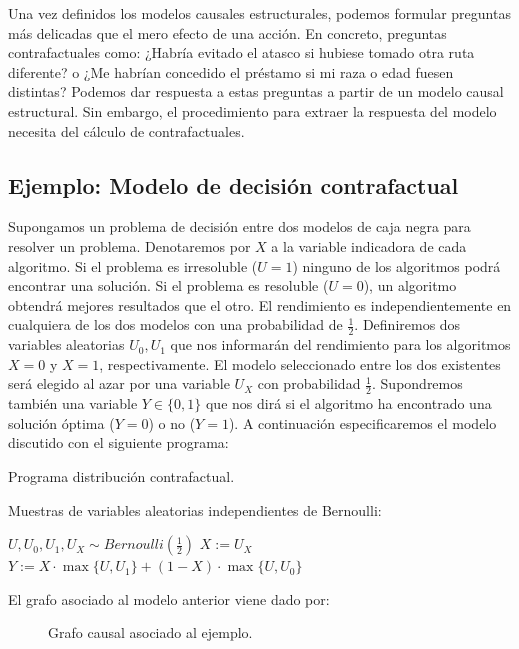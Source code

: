 \documentclass[oneside,openright,titlepage,numbers=noenddot,openany,headinclude,footinclude=true,
cleardoublepage=empty,abstractoff,BCOR=5mm,paper=a4,fontsize=12pt,main=spanish]{scrreprt}
\begin{document}
Una vez definidos los modelos causales estructurales, podemos formular preguntas más delicadas que el mero efecto de una acción. En concreto, preguntas contrafactuales como: ¿Habría evitado el atasco si hubiese tomado otra ruta diferente? o ¿Me habrían concedido el préstamo si mi raza o edad fuesen distintas? Podemos dar respuesta a estas preguntas a partir de un modelo causal estructural. Sin embargo, el procedimiento para extraer la respuesta del modelo necesita del cálculo de contrafactuales.

\subsection{Ejemplo: Modelo de decisión contrafactual}

Supongamos un problema de decisión entre dos modelos de caja negra para resolver un problema. Denotaremos por $X$ a la variable indicadora de cada algoritmo. Si el problema es irresoluble ($U=1$) ninguno de los algoritmos podrá encontrar una solución. Si el problema es resoluble ($U=0$), un algoritmo obtendrá mejores resultados que el otro. El rendimiento es independientemente en cualquiera de los dos modelos con una probabilidad de $\frac{1}{2}$. Definiremos dos variables aleatorias $U_0, U_1$ que nos informarán del rendimiento para los algoritmos $X=0$ y $X=1$, respectivamente. El modelo seleccionado entre los dos existentes será elegido al azar por una variable $U_X$ con probabilidad $\frac{1}{2}$. Supondremos también una variable $Y \in \{0,1\}$ que nos dirá si el algoritmo ha encontrado una solución óptima ($Y=0$) o no ($Y=1$). A continuación especificaremos el modelo discutido con el siguiente programa:

\clearpage

\begin{algorithm}[h]
\caption{Programa distribución contrafactual.}
    Muestras de variables aleatorias independientes de Bernoulli: 
    
    $U,U_0,U_1,U_X \sim  Bernoulli\left(\frac{1}{2}\right)$\;
    $X:=U_X$\;
    $Y:=X \cdot \max\{U,U_1\}+(1-X)\cdot \max\{U,U_0\}$ \;
    \label{alg:programa 4}
\end{algorithm}

El grafo asociado al modelo anterior viene dado por:

\begin{figure}[h]
\centering
{}
\caption{Grafo causal asociado al ejemplo.}
\end{figure}
\end{document}
